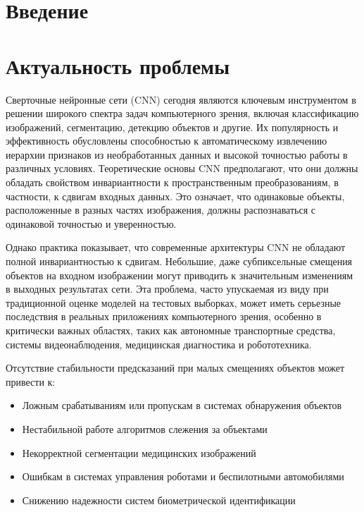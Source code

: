 \section{Введение}
\label{sec:Chapter0} 

\section*{Актуальность проблемы}
\label{intro:relevance}

Сверточные нейронные сети (CNN) сегодня являются ключевым инструментом в решении широкого спектра задач компьютерного зрения, включая классификацию изображений, сегментацию, детекцию объектов и другие. Их популярность и эффективность обусловлены способностью к автоматическому извлечению иерархии признаков из необработанных данных и высокой точностью работы в различных условиях. Теоретические основы CNN предполагают, что они должны обладать свойством инвариантности к пространственным преобразованиям, в частности, к сдвигам входных данных. Это означает, что одинаковые объекты, расположенные в разных частях изображения, должны распознаваться с одинаковой точностью и уверенностью.

Однако практика показывает, что современные архитектуры CNN не обладают полной инвариантностью к сдвигам. Небольшие, даже субпиксельные смещения объектов на входном изображении могут приводить к значительным изменениям в выходных результатах сети. Эта проблема, часто упускаемая из виду при традиционной оценке моделей на тестовых выборках, может иметь серьезные последствия в реальных приложениях компьютерного зрения, особенно в критически важных областях, таких как автономные транспортные средства, системы видеонаблюдения, медицинская диагностика и робототехника.

Отсутствие стабильности предсказаний при малых смещениях объектов может привести к:
\begin{itemize}
    \item Ложным срабатываниям или пропускам в системах обнаружения объектов
    \item Нестабильной работе алгоритмов слежения за объектами
    \item Некорректной сегментации медицинских изображений
    \item Ошибкам в системах управления роботами и беспилотными автомобилями
    \item Снижению надежности систем биометрической идентификации
\end{itemize}

